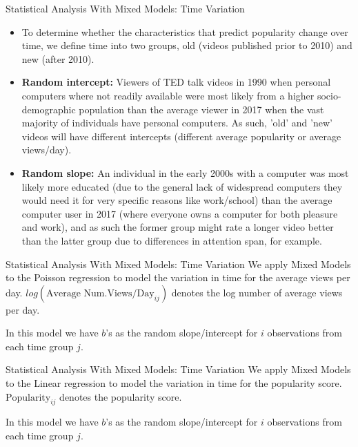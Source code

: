 \begin{frame}{Statistical Analysis With Mixed Models: Time Variation}
	\begin{itemize}
		\item To determine whether the characteristics that predict popularity change over time, we define time into two groups, old (videos published prior to 2010) and new (after 2010). 
		\item \textbf{Random intercept: }Viewers of TED talk videos in 1990 when personal computers where not readily available were most likely from a higher socio-demographic population than the average viewer in 2017 when the vast majority of individuals have personal computers. As such, 'old' and 'new' videos will have different intercepts (different average popularity or average views/day).
		\item \textbf{Random slope: }An individual in the early 2000s with a computer was most likely more educated (due to the general lack of widespread computers they would need it for very specific reasons like work/school) than the average computer user in 2017 (where everyone owns a computer for both pleasure and work), and as such the former group might rate a longer video better than the latter group due to differences in attention span, for example. 
	\end{itemize}
\end{frame}

\begin{frame}{Statistical Analysis With Mixed Models: Time Variation}
We apply Mixed Models to the Poisson regression to model the variation in time for the average views per day. $log(\text{Average Num.Views/Day}_{ij})$ denotes the log number of average views per day.

In this model we have $b$'s as the random slope/intercept for $i$ observations from each time group $j$.
\end{frame}

\begin{frame}{Statistical Analysis With Mixed Models: Time Variation}
We apply Mixed Models to the Linear regression to model the variation in time for the popularity score. $\text{Popularity}_{ij}$ denotes the popularity score.

In this model we have $b$'s as the random slope/intercept for $i$ observations from each time group $j$.
\end{frame}

